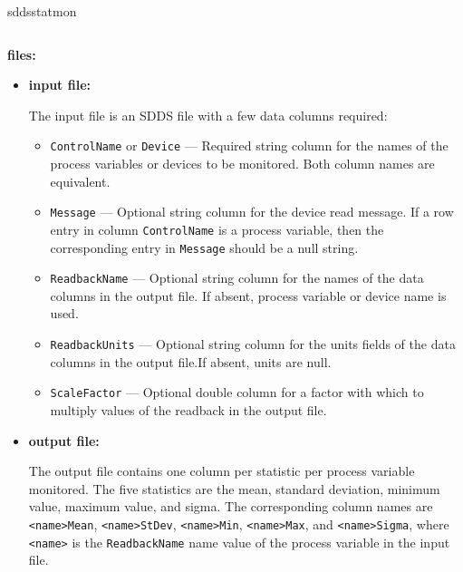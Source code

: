 \begin{sddsprog}{sddsstatmon}
\begin{verbatim}
\end{verbatim}
\item \textbf{files:}
\begin{itemize}
\item \textbf{input file:}\par
The input file is an SDDS file with a few data columns required:
\begin{itemize}
        \item {\tt ControlName} or {\tt Device} --- Required string column for the names of the process variables
                or devices to be monitored. Both column names are equivalent.
        \item {\tt Message} --- Optional string column for the device read message. If a row entry in
                column {\tt ControlName} is a process variable, then the corresponding entry
                in {\tt Message} should be a null string. 
        \item {\tt ReadbackName} --- Optional string column for the names of the data columns in the 
                output file. If absent, process variable or device name is used.
        \item {\tt ReadbackUnits} --- Optional string column for the units fields of the data columns in the 
                output file.If absent, units are null.
        \item {\tt ScaleFactor} --- Optional double column for a factor with which to multiply
                values of the readback in the output file.
\end{itemize}

\item \textbf{output file:}\par
The output file contains one column per statistic per process variable monitored.
The five statistics are the mean, standard deviation, minimum value,
maximum value, and sigma. The corresponding column names are {\tt <name>Mean}, {\tt <name>StDev},
{\tt <name>Min}, {\tt <name>Max}, and {\tt <name>Sigma}, where {\tt <name>}
is the {\tt ReadbackName} name value of the process variable in the input file.


\end{itemize}
\end{sddsprog}
